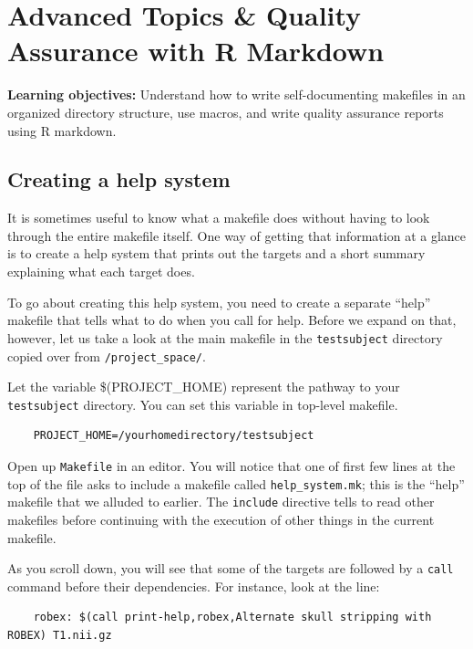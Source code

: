 \chapter{Advanced Topics \& Quality Assurance with R Markdown} 
\label{sec:practicum4}

\textbf{Learning objectives:} Understand how to write self-documenting makefiles in an organized directory structure, use macros, and write quality assurance reports using R markdown.


\section{Creating a \maken{} help system}
It is sometimes useful to know what a makefile does without having to look through the entire makefile itself. One way of getting that information at a glance is to create a \maken{} help system that prints out the targets and a short summary explaining what each target does. 

To go about creating this help system, you need to create a separate ``help'' makefile that tells \maken{} what to do when you call for help. Before we expand on that, however, let us take a look at the main makefile in the \texttt{testsubject} directory copied over from \texttt{/project_space/}.

Let the variable \$(PROJECT_HOME) represent the pathway to your \texttt{testsubject} directory. You can set this variable in top-level makefile.
\begin{lstlisting}
	PROJECT_HOME=/yourhomedirectory/testsubject
\end{lstlisting}

Open up \texttt{Makefile} in an editor. You will notice that one of first few lines at the top of the file asks \maken{} to include a makefile called \texttt{help_system.mk}; this is the ``help'' makefile that we alluded to earlier. The \texttt{include} directive tells \maken{} to read other makefiles before continuing with the execution of other things in the current makefile.    

As you scroll down, you will see that some of the targets are followed by a \texttt{call} command before their dependencies. For instance, look at the line:
\begin{lstlisting}
	robex: $(call print-help,robex,Alternate skull stripping with ROBEX) T1.nii.gz
\end{lstlisting}

